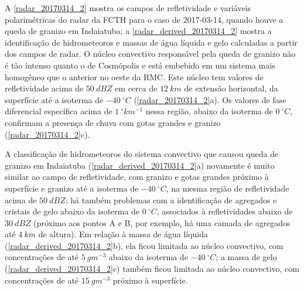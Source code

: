A \autoref{radar_20170314_2} mostra os campos de refletividade e variáveis polarimétricas do radar da FCTH para o caso de 2017-03-14, quando houve a queda de granizo em Indaiatuba; a \autoref{radar_derived_20170314_2} mostra a identificação de hidrometeoros e massas de água líquida e gelo calculadas a partir dos campos de radar. O núcleo convectivo responsável pela queda de granizo não é tão intenso quanto o de Cosmópolis e está embebido em um sistema mais homogêneo que o anterior no oeste da RMC. Este núcleo tem valores de refletividade acima de $50\:dBZ$ em cerca de $12\:km$ de extensão horizontal, da superfície até a isoterma de $-40\:^{\circ}C$ (\autoref{radar_20170314_2}a). Os valores de fase diferencial específica acima de $1\:^{\circ}km^{-1}$ nessa região, abaixo da isoterma de $0\:^{\circ}C$, confirmam a presença de chuva com gotas grandes e granizo (\autoref{radar_20170314_2}c).

A classificação de hidrometeoros do sistema convectivo que causou queda de granizo em Indaiatuba (\autoref{radar_derived_20170314_2}a) novamente é muito similar ao campo de refletividade, com granizo e gotas grandes próximo à superfície e granizo até a isoterma de $-40\:^{\circ}C$, na mesma região de refletividade acima de $50\:dBZ$; há também problemas com a identificação de agregados e cristais de gelo abaixo da isoterma de $0\:^{\circ}C$, associados à refletividades abaixo de $30\:dBZ$ (próximo aos pontos A e B, por exemplo, há uma camada de agregados até $4\:km$ de altura). Em relação à massa de água líquida (\autoref{radar_derived_20170314_2}b), ela ficou limitada ao núcleo convectivo, com concentrações de até $5\:gm^{-3}$ abaixo da isoterma de $-40\:^{\circ}C$; a massa de gelo (\autoref{radar_derived_20170314_2}c) também ficou limitada ao núcleo convectivo, com concentrações de até $15\:gm^{-3}$ próximo à superfície.

